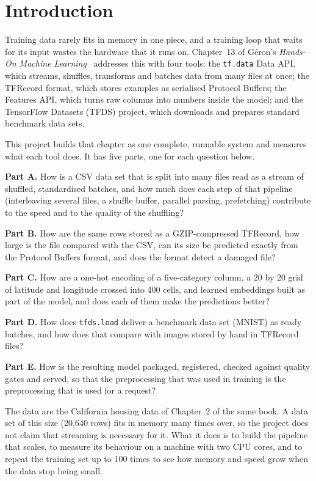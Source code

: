 \section{Introduction}
\label{sec:intro}

Training data rarely fits in memory in one piece, and a training loop that waits for its input wastes the hardware that it runs on. Chapter~13 of Géron's \emph{Hands-On Machine Learning}~\cite{geron} addresses this with four tools: the \texttt{tf.data} Data API, which streams, shuffles, transforms and batches data from many files at once; the TFRecord format, which stores examples as serialised Protocol Buffers; the Features API, which turns raw columns into numbers inside the model; and the TensorFlow Datasets (TFDS) project, which downloads and prepares standard benchmark data sets.

This project builds that chapter as one complete, runnable system and measures what each tool does. It has five parts, one for each question below.

\textbf{Part A.} How is a CSV data set that is split into many files read as a stream of shuffled, standardised batches, and how much does each step of that pipeline (interleaving several files, a shuffle buffer, parallel parsing, prefetching) contribute to the speed and to the quality of the shuffling?

\textbf{Part B.} How are the same rows stored as a GZIP-compressed TFRecord, how large is the file compared with the CSV, can its size be predicted exactly from the Protocol Buffers format, and does the format detect a damaged file?

\textbf{Part C.} How are a one-hot encoding of a five-category column, a 20 by 20 grid of latitude and longitude crossed into 400 cells, and learned embeddings built as part of the model, and does each of them make the predictions better?

\textbf{Part D.} How does \texttt{tfds.load} deliver a benchmark data set (MNIST) as ready batches, and how does that compare with images stored by hand in TFRecord files?

\textbf{Part E.} How is the resulting model packaged, registered, checked against quality gates and served, so that the preprocessing that was used in training is the preprocessing that is used for a request?

The data are the California housing data of Chapter~2 of the same book. A data set of this size (20,640 rows) fits in memory many times over, so the project does not claim that streaming is necessary for it. What it does is to build the pipeline that scales, to measure its behaviour on a machine with two CPU cores, and to repeat the training set up to 100 times to see how memory and speed grow when the data stop being small.

